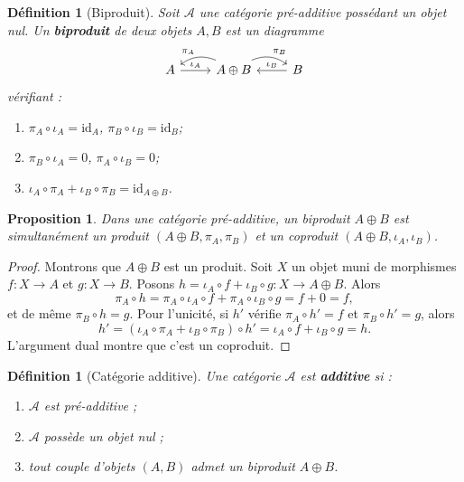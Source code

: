 \documentclass[a4paper,12pt]{book}
\newcommand{\id}{\mathrm{id}}
\newtheorem{proposition}[theoreme]{Proposition}
\newtheorem{definition}[theoreme]{Définition}
\begin{document}
\begin{definition}[Biproduit]\label{def:biproduct}
Soit $\mathcal{A}$ une catégorie pré-additive possédant un objet nul.
Un \textbf{biproduit} de deux objets $A, B$ est un
diagramme
\[
\begin{tikzcd}
A \arrow[r, "\iota_A"] & A \oplus B
  \arrow[l, bend right, "\pi_A"']
  \arrow[r, bend left, "\pi_B"]
& B \arrow[l, "\iota_B"']
\end{tikzcd}
\]
vérifiant :
\begin{enumerate}[label=(\alph*)]
\item $\pi_A \circ \iota_A = \id_A$, \quad $\pi_B \circ \iota_B = \id_B$;
\item $\pi_B \circ \iota_A = 0$, \quad $\pi_A \circ \iota_B = 0$;
\item $\iota_A \circ \pi_A + \iota_B \circ \pi_B = \id_{A \oplus B}$.
\end{enumerate}
\end{definition}

\begin{proposition}\label{prop:biproduct-product-coproduct}
Dans une catégorie pré-additive, un biproduit $A \oplus B$ est
simultanément un produit $(A \oplus B, \pi_A, \pi_B)$ et un
coproduit $(A \oplus B, \iota_A, \iota_B)$.
\end{proposition}

\begin{proof}
Montrons que $A \oplus B$ est un produit. Soit $X$ un objet muni de
morphismes $f \colon X \to A$ et $g \colon X \to B$. Posons
$h = \iota_A \circ f + \iota_B \circ g \colon X \to A \oplus B$.
Alors
\[
  \pi_A \circ h = \pi_A \circ \iota_A \circ f + \pi_A \circ \iota_B \circ g
  = f + 0 = f,
\]
et de même $\pi_B \circ h = g$. Pour l'unicité, si $h'$ vérifie
$\pi_A \circ h' = f$ et $\pi_B \circ h' = g$, alors
\[
  h' = (\iota_A \circ \pi_A + \iota_B \circ \pi_B) \circ h'
  = \iota_A \circ f + \iota_B \circ g = h.
\]
L'argument dual montre que c'est un coproduit.
\end{proof}

\begin{definition}[Catégorie additive]\label{def:additive-cat}
Une catégorie $\mathcal{A}$ est \textbf{additive} si :
\begin{enumerate}[label=(\roman*)]
\item $\mathcal{A}$ est pré-additive ;
\item $\mathcal{A}$ possède un objet nul ;
\item tout couple d'objets $(A, B)$ admet un biproduit $A \oplus B$.
\end{enumerate}
\end{definition}
\end{document}
